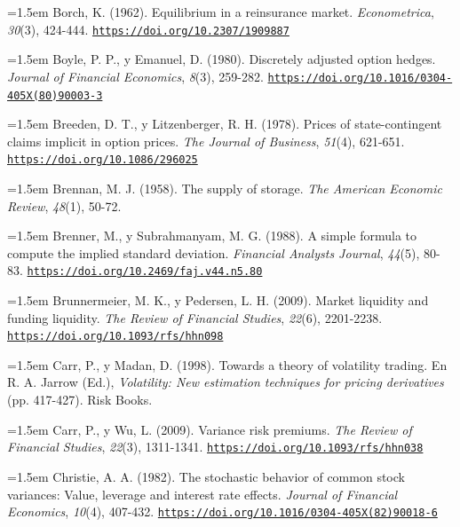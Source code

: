 \documentclass[10pt,a4paper]{article}
\begin{document}
\noindent\hangindent=1.5em Borch, K. (1962). Equilibrium in a reinsurance market. \textit{Econometrica}, \textit{30}(3), 424-444. \href{https://doi.org/10.2307/1909887}{\nolinkurl{https://doi.org/10.2307/1909887}}

\noindent\hangindent=1.5em Boyle, P. P., y Emanuel, D. (1980). Discretely adjusted option hedges. \textit{Journal of Financial Economics}, \textit{8}(3), 259-282. \href{https://doi.org/10.1016/0304-405X(80)90003-3}{\nolinkurl{https://doi.org/10.1016/0304-405X(80)90003-3}}

\noindent\hangindent=1.5em Breeden, D. T., y Litzenberger, R. H. (1978). Prices of state-contingent claims implicit in option prices. \textit{The Journal of Business}, \textit{51}(4), 621-651. \href{https://doi.org/10.1086/296025}{\nolinkurl{https://doi.org/10.1086/296025}}

\noindent\hangindent=1.5em Brennan, M. J. (1958). The supply of storage. \textit{The American Economic Review}, \textit{48}(1), 50-72.

\noindent\hangindent=1.5em Brenner, M., y Subrahmanyam, M. G. (1988). A simple formula to compute the implied standard deviation. \textit{Financial Analysts Journal}, \textit{44}(5), 80-83. \href{https://doi.org/10.2469/faj.v44.n5.80}{\nolinkurl{https://doi.org/10.2469/faj.v44.n5.80}}

\noindent\hangindent=1.5em Brunnermeier, M. K., y Pedersen, L. H. (2009). Market liquidity and funding liquidity. \textit{The Review of Financial Studies}, \textit{22}(6), 2201-2238. \href{https://doi.org/10.1093/rfs/hhn098}{\nolinkurl{https://doi.org/10.1093/rfs/hhn098}}

\noindent\hangindent=1.5em Carr, P., y Madan, D. (1998). Towards a theory of volatility trading. En R. A. Jarrow (Ed.), \textit{Volatility: New estimation techniques for pricing derivatives} (pp. 417-427). Risk Books.

\noindent\hangindent=1.5em Carr, P., y Wu, L. (2009). Variance risk premiums. \textit{The Review of Financial Studies}, \textit{22}(3), 1311-1341. \href{https://doi.org/10.1093/rfs/hhn038}{\nolinkurl{https://doi.org/10.1093/rfs/hhn038}}

\noindent\hangindent=1.5em Christie, A. A. (1982). The stochastic behavior of common stock variances: Value, leverage and interest rate effects. \textit{Journal of Financial Economics}, \textit{10}(4), 407-432. \href{https://doi.org/10.1016/0304-405X(82)90018-6}{\nolinkurl{https://doi.org/10.1016/0304-405X(82)90018-6}}
\end{document}

